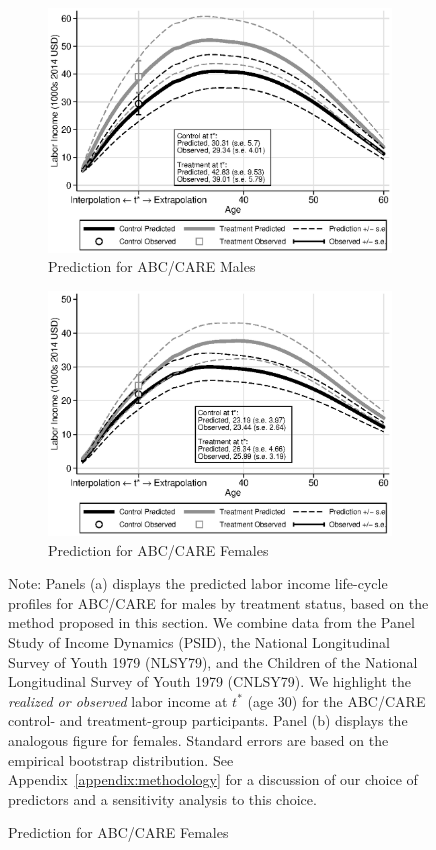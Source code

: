 \begin{figure}
\centering
\caption{Labor Income Profile Predictions}\label{fig:labor-income-profiles}
\begin{subfigure}[h]{0.5\textwidth}
		\centering
		\caption{Prediction for ABC/CARE Males} \label{fig:labor-income-profilesc}
		\includegraphics[width=\textwidth]{output/labor_25-65_pset1_mset3_male.eps}
\end{subfigure}%
\begin{subfigure}[h]{0.5\textwidth}
		\centering
		\caption{Prediction for ABC/CARE Females} \label{fig:labor-income-profilesa}
		\includegraphics[width=\textwidth]{output/labor_25-65_pset1_mset3_female.eps}
\end{subfigure}
\footnotesize \justify
Note: Panels (a) displays the predicted labor income life-cycle profiles for ABC/CARE for males by treatment status, based on the method proposed in this section. We combine data from the Panel Study of Income Dynamics (PSID), the National Longitudinal Survey of Youth 1979 (NLSY79), and the Children of the National Longitudinal Survey of Youth 1979 (CNLSY79). We highlight the \textit{realized or observed} labor income at $t^*$ (age 30) for the ABC/CARE control- and treatment-group participants. Panel (b) displays the analogous figure for females. Standard errors are based on the empirical bootstrap distribution.  See Appendix~\ref{appendix:methodology} for a discussion of our choice of predictors and a sensitivity analysis to this choice.

\end{figure}

